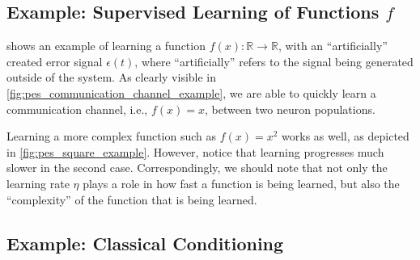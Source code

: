 \documentclass[10pt,letterpaper,oneside]{article}
\begin{document}
\subsection{Example: Supervised Learning of Functions $f$}

 shows an example of learning a function $f(x) : \mathbb{R} \longrightarrow \mathbb{R}$, with an \enquote{artificially} created error signal $\epsilon(t)$, where \enquote{artificially} refers to the signal being generated outside of the system. As clearly visible in \cref{fig:pes_communication_channel_example}, we are able to quickly learn a communication channel, i.e., $f(x) = x$, between two neuron populations.

Learning a more complex function such as $f(x) = x^2$ works as well, as depicted in \cref{fig:pes_square_example}. However, notice that learning progresses much slower in the second case. Correspondingly, we should note that not only the learning rate $\eta$ plays a role in how fast a function is being learned, but also the \enquote{complexity} of the function that is being learned.



\subsection{Example: Classical Conditioning}
\end{document}
